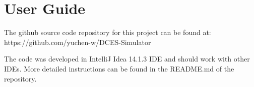 \chapter{User Guide}
\label{Guide}

The github source code repository for this project can be found at: https://github.com/yuchen-w/DCES-Simulator

The code was developed in IntelliJ Idea 14.1.3 IDE and should work with other IDEs. More detailed instructions can be found in the README.md of the repository.
